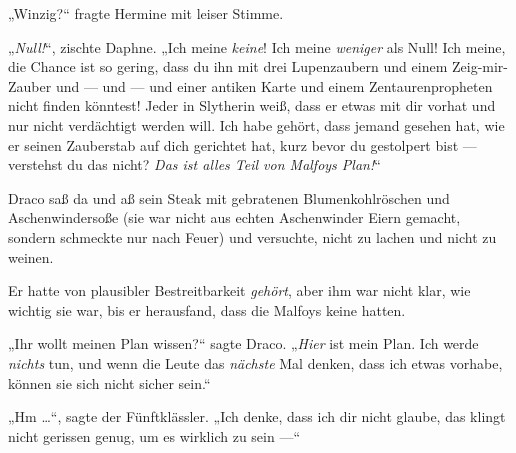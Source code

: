 „Winzig?“ fragte Hermine mit leiser Stimme.

„\emph{Null!}“, zischte Daphne.
„Ich meine \emph{keine}! Ich meine \emph{weniger} als Null! Ich meine, die Chance ist so gering, dass du ihn mit drei Lupenzaubern und einem Zeig-mir-Zauber und — und — und einer antiken Karte und einem Zentaurenpropheten nicht finden könntest! Jeder in Slytherin weiß, dass er etwas mit dir vorhat und nur nicht verdächtigt werden will. Ich habe gehört, dass jemand gesehen hat, wie er seinen Zauberstab auf dich gerichtet hat, kurz bevor du gestolpert bist — verstehst du das nicht? \emph{Das ist alles Teil von Malfoys Plan!}“

\later

Draco saß da und aß sein Steak mit gebratenen Blumenkohlröschen und Aschenwindersoße (sie war nicht aus echten Aschenwinder Eiern gemacht, sondern schmeckte nur nach Feuer) und versuchte, nicht zu lachen und nicht zu weinen.

Er hatte von plausibler Bestreitbarkeit \emph{gehört}, aber ihm war nicht klar, wie wichtig sie war, bis er herausfand, dass die Malfoys keine hatten.

„Ihr wollt meinen Plan wissen?“ sagte Draco.
„\emph{Hier} ist mein Plan. Ich werde \emph{nichts} tun, und wenn die Leute das \emph{nächste} Mal denken, dass ich etwas vorhabe, können sie sich nicht sicher sein.“

„Hm …“, sagte der Fünftklässler.
„Ich denke, dass ich dir nicht glaube, das klingt nicht gerissen genug, um es wirklich zu sein —“


